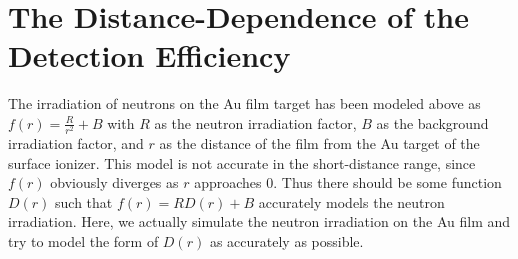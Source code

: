 \documentclass{article}
\begin{document}
\section{The Distance-Dependence of the Detection Efficiency}
The irradiation of neutrons on the Au film target has been modeled above as $f(r) = \frac{R}{r^2} + B$ with $R$ as the neutron irradiation factor, $B$ as the background irradiation factor, and $r$ as the distance of the film from the Au target of the surface ionizer. This model is not accurate in the short-distance range, since $f(r)$ obviously diverges as $r$ approaches 0. Thus there should be some function $D(r)$ such that $f(r) = RD(r) + B$ accurately models the neutron irradiation. Here, we actually simulate the neutron irradiation on the Au film and try to model the form of $D(r)$ as accurately as possible.
\end{document}
